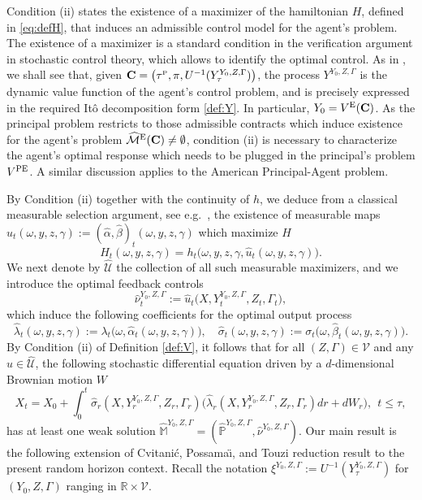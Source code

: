 \documentclass[11pt,a4paper]{article}
\numberwithin{equation}{section}
\def\dbM{\mathbb{M}}
\def\dbP{\mathbb{P}}
\def\dbR{\mathbb{R}}
\newcommand{\cM}{\mathcal{M}}
\newcommand{\cV}{\mathcal{V}}
\newcommand{\Cbf}{\mathbf{C}}
\theoremstyle{definition}
\begin{document}
Condition (ii) states the existence of a maximizer of the hamiltonian $H$, defined in \eqref{eq:defH}, that induces an admissible control model for the agent's problem. 
The existence of a maximizer is a standard condition in the verification argument in stochastic control theory, which allows to identify the optimal control. 
As in \cite{CPT18}, we shall see that, given $\Cbf=\big(\tau^{\scriptscriptstyle\rm P},\pi,U^{-1}(Y^{Y_0,Z,\Gamma}_\tau)\big)$, the process $Y^{Y_0,Z,\Gamma}$ is the dynamic value function of the agent's control problem, 
   and is precisely expressed in the required It\^o decomposition form \eqref{def:Y}. 
In particular, $Y_0=V^{\rm E}(\Cbf)$. 
As the principal problem restricts to those admissible contracts which induce existence for the agent's problem $\widehat{\cM}^{\rm E}(\Cbf)\neq\emptyset$, 
   condition (ii) is necessary to characterize the agent's optimal response which needs to be plugged in the principal's problem $V^{\rm PE}$. 
A similar discussion applies to the American Principal-Agent problem.
 
By Condition (ii) together with the continuity of $h$, we deduce from a classical measurable selection argument, see e.g.~\cite{Benes70, Benes71}, 
   the existence of measurable maps $\widehat u_t(\omega,y,z,\gamma):=(\widehat\alpha,\widehat\beta)_t(\omega,y,z,\gamma)$ which maximize $H$
     $$ H_t(\omega,y,z,\gamma) = h_t\big(\omega,y,z,\gamma,\widehat u_t(\omega,y,z,\gamma)\big). $$
We next denote by $\widehat{\mathcal U}$ the collection of all such measurable maximizers, and we introduce the optimal feedback controls
     $$ \widehat{\nu}^{Y_0,Z,\Gamma}_t:=\widehat u_t\big(X,Y^{Y_0,Z,\Gamma}_t,Z_t,\Gamma_t\big), 
     $$ 
which induce the following coefficients for the optimal output process     
   \begin{equation*}
     \widehat{\lambda}_t(\omega,y,z,\gamma) := \lambda_t\big(\omega,\widehat{\alpha}_t(\omega,y,z,\gamma)\big), \quad 
     \widehat{\sigma}_t(\omega,y,z,\gamma) := \sigma_t\big(\omega, \widehat{\beta}_t(\omega,y,z,\gamma)\big).
   \end{equation*}
By Condition (ii) of Definition \ref{def:V}, it follows that for all $(Z,\Gamma)\in\cV$ and any $\widehat u\in\widehat{\mathcal U}$, the following stochastic differential equation driven by a $d$-dimensional Brownian motion $W$
  \begin{equation} \label{eq:OptimalSDE}
    X_t = X_0 +\int_0^t \widehat{\sigma}_r(X,Y_r^{Y_0,Z,\Gamma},Z_r,\Gamma_r)\big(\widehat{\lambda}_r(X,Y_r^{Y_0,Z,\Gamma},Z_r,\Gamma_r)dr + dW_r\big),~~t\leq\tau,
  \end{equation}
  has at least one weak solution $\widehat{\dbM}^{Y_0,Z,\Gamma}=(\widehat{\dbP}^{Y_0,Z,\Gamma},\widehat{\nu}^{Y_0,Z,\Gamma})$. 
Our main result is the following extension of Cvitani\'c, Possama\"{\i}, and Touzi \cite{CPT18} reduction result to the present random horizon context. 
Recall the notation $\xi^{Y_0,Z,\Gamma}:=U^{-1}(Y^{Y_0,Z,\Gamma}_\tau)$ for $(Y_0,Z,\Gamma)$ ranging in $\dbR\times\cV$.
\end{document}
